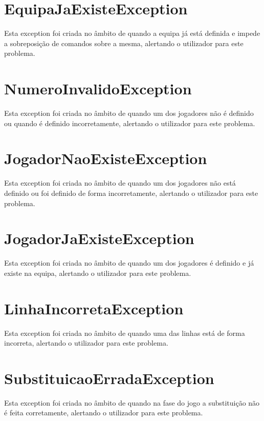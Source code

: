 \documentclass[a4paper]{report}
\begin{document}
    \section{EquipaJaExisteException}
	
    Esta exception foi criada no âmbito de quando a equipa já está definida e impede a sobreposição de comandos sobre a mesma, alertando o utilizador para este problema.
	
	\section{NumeroInvalidoException}
	
	Esta exception foi criada no âmbito de quando um dos jogadores não é definido ou quando é definido incorretamente, alertando o utilizador para este problema.
	
	\section{JogadorNaoExisteException}
	
	Esta exception foi criada no âmbito de quando um dos jogadores não está definido ou foi definido de forma incorretamente, alertando o utilizador para este problema.
	
	
	\section{JogadorJaExisteException}
	
	Esta exception foi criada no âmbito de quando um dos jogadores é definido e já existe na equipa, alertando o utilizador para este problema.
	
	\section{LinhaIncorretaException}
	
	Esta exception foi criada no âmbito de quando uma das linhas está de forma incorreta, alertando o utilizador para este problema.  
	
	\section{SubstituicaoErradaException}
	
	Esta exception foi criada no âmbito de quando na fase do jogo a substituição não é feita corretamente, alertando o utilizador para este problema.
	
\end{document}
